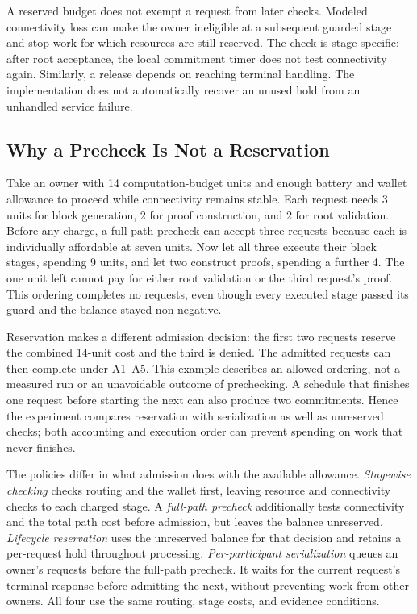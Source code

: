 A reserved budget does not exempt a request from later checks. Modeled
connectivity loss can make the owner ineligible at a subsequent guarded
stage and stop work for which resources are still reserved. The check is
stage-specific: after root acceptance, the local commitment timer does not
test connectivity again. Similarly, a release depends on reaching terminal
handling. The implementation does not automatically recover an unused hold
from an unhandled service failure.

\subsection{Why a Precheck Is Not a Reservation}

Take an owner with 14 computation-budget units and enough battery and wallet
allowance to proceed while connectivity remains stable. Each request needs
3 units for block generation, 2 for proof construction, and 2 for root
validation. Before any charge, a full-path precheck can accept three requests
because each is individually affordable at seven units. Now let all three
execute their block stages, spending 9 units, and let two construct proofs,
spending a further 4. The one unit left cannot pay for either root validation
or the third request's proof. This ordering completes no requests, even though
every executed stage passed its guard and the balance stayed non-negative.

Reservation makes a different admission decision: the first two requests
reserve the combined 14-unit cost and the third is denied. The admitted
requests can then complete under A1--A5. This example describes an allowed
ordering, not a measured run or an unavoidable outcome of prechecking.
A schedule that finishes one request before starting the next can also
produce two commitments. Hence the experiment compares reservation with
serialization as well as unreserved checks; both accounting and execution
order can prevent spending on work that never finishes.

The policies differ in what admission does with the available allowance.
\emph{Stagewise checking} checks routing and the wallet first, leaving
resource and connectivity checks to each charged stage. A \emph{full-path
precheck} additionally tests connectivity and the total path cost before
admission, but leaves the balance unreserved. \emph{Lifecycle reservation}
uses the unreserved balance for that decision and retains a per-request hold
throughout processing. \emph{Per-participant serialization} queues an owner's
requests before the full-path precheck. It waits for the current request's
terminal response before admitting the next, without preventing work from
other owners. All four use the same routing, stage costs, and evidence
conditions.

